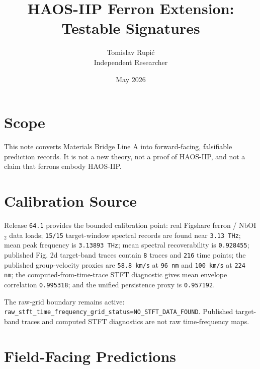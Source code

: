 \documentclass[11pt]{article}
\title{HAOS-IIP Ferron Extension: Testable Signatures}
\author{Tomislav Rupi\'c \\ Independent Researcher}
\date{May 2026}
\begin{document}
\maketitle

\section*{Scope}

This note converts Materials Bridge Line A into forward-facing, falsifiable
prediction records. It is not a new theory, not a proof of HAOS-IIP, and not a
claim that ferrons embody HAOS-IIP.

\section*{Calibration Source}

Release \texttt{64.1} provides the bounded calibration point: real Figshare
ferron / NbOI$_2$ data loads; \texttt{15/15} target-window spectral records are
found near \texttt{3.13 THz}; mean peak frequency is \texttt{3.13893 THz}; mean
spectral recoverability is \texttt{0.928455}; published Fig. 2d target-band
traces contain \texttt{8} traces and \texttt{216} time points; the published
group-velocity proxies are \texttt{58.8 km/s} at \texttt{96 nm} and
\texttt{100 km/s} at \texttt{224 nm}; the computed-from-time-trace STFT
diagnostic gives mean envelope correlation \texttt{0.995318}; and the unified
persistence proxy is \texttt{0.957192}.

The raw-grid boundary remains active:
\texttt{raw\_stft\_time\_frequency\_grid\_status=NO\_STFT\_DATA\_FOUND}.
Published target-band traces and computed STFT diagnostics are not raw
time-frequency maps.

\section*{Field-Facing Predictions}
\end{document}
